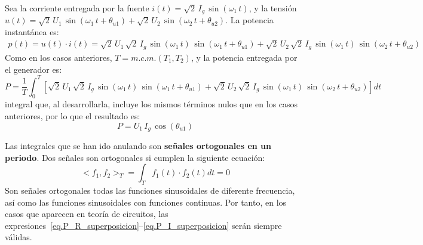 Sea la corriente entregada por la fuente $i(t)=\sqrt{2}\,I_g\,\sin(\omega_1\,t)$, y la tensión $u(t)=\sqrt{2}\,U_{1}\,\sin(\omega_1\,t+\theta_{u1})+\sqrt{2}\,U_{2}\,\sin(\omega_2\,t+\theta_{u2})$. La potencia instantánea es: 
\begin{align*}
  p(t) = u(t)\cdot i(t) = \sqrt{2}\,U_{1}\, \sqrt{2}\,I_g\,\sin(\omega_1\,t)\,\sin(\omega_1\,t+\theta_{u1}) + \sqrt{2}\,U_{2}\, \sqrt{2}\,I_g\,\sin(\omega_1\,t)\,\sin(\omega_2\,t+\theta_{u2})
\end{align*} 
Como en los casos anteriores, $T=m.c.m.(T_1,T_2)$, y la potencia entregada por el generador es: 
\begin{equation*}
    P=\dfrac{1}{T}\int_0^T \left[\sqrt{2}\,U_{1}\, \sqrt{2}\,I_g\,\sin(\omega_1\,t)\,\sin(\omega_1\,t+\theta_{u1})+\sqrt{2}\,U_{2}\, \sqrt{2}\,I_g\,\sin(\omega_1\,t)\,\sin(\omega_2\,t+\theta_{u2}) \right] dt
\end{equation*}
integral que, al desarrollarla, incluye los mismos términos nulos que en los casos anteriores, por lo que el resultado es: 
\begin{equation}\label{eq.P_I_superposicion}
    \boxed{P=U_1\,I_g\,\cos(\theta_{u1})}
\end{equation}
    
\begin{remark}
    Las integrales que se han ido anulando son \textbf{señales ortogonales en un periodo}. Dos señales son ortogonales si cumplen la siguiente ecuación: 
\begin{equation*}
    <f_1, f_2>_T = \int_T f_1(t) \cdot f_2(t) dt = 0
\end{equation*}
Son señales ortogonales todas las funciones sinusoidales de diferente frecuencia, así como las funciones sinusoidales con funciones continuas. Por tanto, en los casos que aparecen en teoría de circuitos, las expresiones~\eqref{eq.P_R_superposicion}--\eqref{eq.P_I_superposicion} serán siempre válidas. 
\end{remark}

